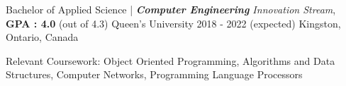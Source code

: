 

\begin{cventries}

  \cventry
    {Bachelor of Applied Science | \textit{\textbf{Computer Engineering} Innovation Stream}, \textbf{GPA : 4.0} (out of 4.3)} %
    {Queen's University} %
    { 2018 - 2022 (expected)} %
    {Kingston, Ontario, Canada} %
    {
    \begin{cvitems} %
        \item {Relevant Coursework: Object Oriented Programming, Algorithms and Data Structures, Computer Networks, Programming Language Processors}
      \end{cvitems}
    }
\end{cventries}
